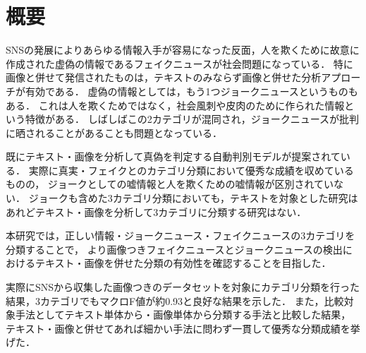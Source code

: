 \chapter{概要}

SNSの発展によりあらゆる情報入手が容易になった反面，人を欺くために故意に作成された虚偽の情報であるフェイクニュースが社会問題になっている．
特に画像と併せて発信されたものは，テキストのみならず画像と併せた分析アプローチが有効である．
虚偽の情報としては，もう1つジョークニュースというものもある．
これは人を欺くためではなく，社会風刺や皮肉のために作られた情報という特徴がある．
しばしばこの2カテゴリが混同され，ジョークニュースが批判に晒されることがあることも問題となっている．

既にテキスト・画像を分析して真偽を判定する自動判別モデルが提案されている．
実際に真実・フェイクとのカテゴリ分類において優秀な成績を収めているものの，
ジョークとしての嘘情報と人を欺くための嘘情報が区別されていない．
ジョークも含めた3カテゴリ分類においても，テキストを対象とした研究はあれどテキスト・画像を分析して3カテゴリに分類する研究はない．


本研究では，正しい情報・ジョークニュース・フェイクニュースの3カテゴリを分類することで，
より画像つきフェイクニュースとジョークニュースの検出におけるテキスト・画像を併せた分類の有効性を確認することを目指した．


実際にSNSから収集した画像つきのデータセットを対象にカテゴリ分類を行った結果，3カテゴリでもマクロF値が約0.93と良好な結果を示した．
また，比較対象手法としてテキスト単体から・画像単体から分類する手法と比較した結果，
テキスト・画像と併せてあれば細かい手法に問わず一貫して優秀な分類成績を挙げた．

%